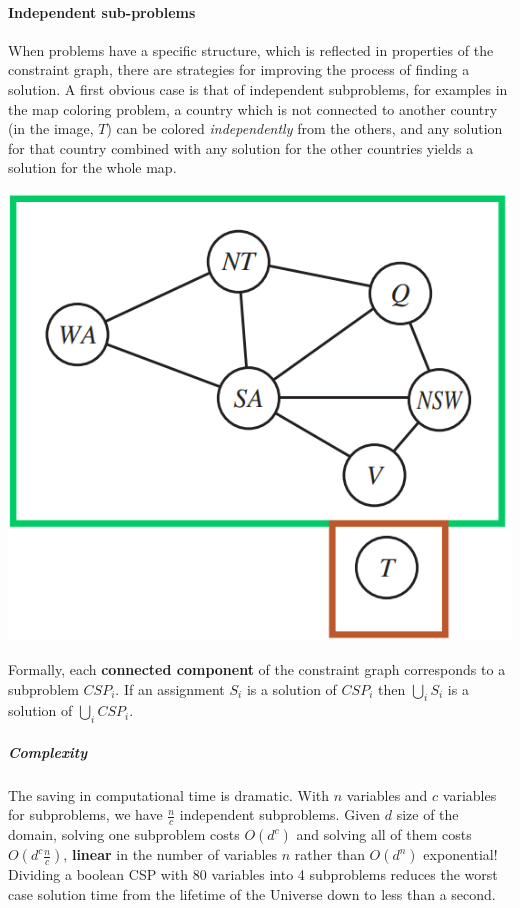 \documentclass[10pt]{report}
\begin{document}
\paragraph{Independent sub-problems} When problems have a specific structure, which is reflected in properties of the constraint graph, there are strategies for improving the process of finding a solution. A first obvious case is that of independent subproblems, for examples in the map coloring problem, a country which is not connected to another country (in the image, $T$) can be colored \textit{independently} from the others, and any solution for that country combined with any solution for the other countries yields a solution for the whole map.
\begin{center}
	\includegraphics[scale=0.75]{8.png}
\end{center}
Formally, each \textbf{connected component} of the constraint graph corresponds to a subproblem $CSP_i$. If an assignment $S_i$ is a solution of $CSP_i$ then $\bigcup_i S_i$ is a solution of $\bigcup_i CSP_i$.
\subparagraph{Complexity} The saving in computational time is dramatic. With $n$ variables and $c$ variables for subproblems, we have $\frac{n}{c}$ independent subproblems. Given $d$ size of the domain, solving one subproblem costs $O(d^c)$ and solving all of them costs $O(d^c\frac{n}{c})$, \textbf{linear} in the number of variables $n$ rather than $O(d^n)$ exponential!\\
Dividing a boolean CSP with 80 variables into 4 subproblems reduces the worst case solution time from the lifetime of the Universe down to less than a second.
\end{document}
